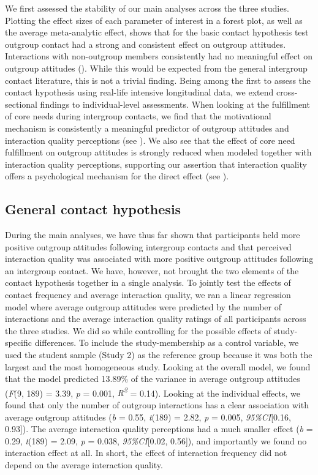 We first assessed the stability of our main analyses across the three
studies. Plotting the effect sizes of each parameter of interest in a
forest plot, as well as the average meta-analytic effect, shows that for
the basic contact hypothesis test outgroup contact had a strong and
consistent effect on outgroup attitudes. Interactions with non-outgroup
members consistently had no meaningful effect on outgroup attitudes
(). While this would be expected from the
general intergroup contact literature, this is not a trivial finding.
Being among the first to assess the contact hypothesis using real-life
intensive longitudinal data, we extend cross-sectional findings to
individual-level assessments. When looking at the fulfillment of core
needs during intergroup contacts, we find that the motivational
mechanism is consistently a meaningful predictor of outgroup attitudes
and interaction quality perceptions (see
). We also see that the
effect of core need fulfillment on outgroup attitudes is strongly
reduced when modeled together with interaction quality perceptions,
supporting our assertion that interaction quality offers a psychological
mechanism for the direct effect (see
).

\subsection{General contact hypothesis}

During the main analyses, we have thus far shown that participants held
more positive outgroup attitudes following intergroup contacts and that
perceived interaction quality was associated with more positive outgroup
attitudes following an intergroup contact. We have, however, not brought
the two elements of the contact hypothesis together in a single
analysis. To jointly test the effects of contact frequency and average
interaction quality, we ran a linear regression model where average
outgroup attitudes were predicted by the number of interactions and the
average interaction quality ratings of all participants across the three
studies. We did so while controlling for the possible effects of
study-specific differences. To include the study-membership as a control
variable, we used the student sample (Study 2) as the reference group
because it was both the largest and the most homogeneous study. Looking
at the overall model, we found that the model predicted 13.89\% of the
variance in average outgroup attitudes (\textit{F}(9, 189) = 3.39,
\textit{p} = 0.001, \textit{R\textsuperscript{2}} = 0.14). Looking at
the individual effects, we found that only the number of outgroup
interactions has a clear association with average outgroup attitudes
(\textit{b} = 0.55, \textit{t}(189) = 2.82, \textit{p} = 0.005,
\textit{95\%CI}{[}0.16, 0.93{]}). The average interaction quality
perceptions had a much smaller effect (\textit{b} = 0.29,
\textit{t}(189) = 2.09, \textit{p} = 0.038, \textit{95\%CI}{[}0.02,
0.56{]}), and importantly we found no interaction effect at all. In
short, the effect of interaction frequency did not depend on the average
interaction quality.

